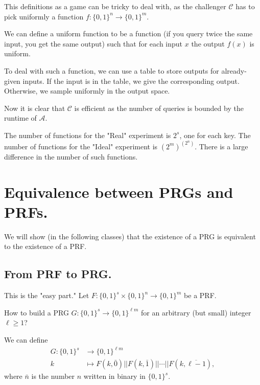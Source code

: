 \documentclass[./main]{subfiles}
\begin{document}
  \begin{rmk}
    This definitions as a game can be tricky to deal with, as the challenger $\mathcal{C}$ has to pick uniformly a function $f : \{0,1\} ^n \to \{0,1\}^m$.

    We can define a uniform function to be a function (if you query twice the same input, you get the same output) such that for each input $x$ the output $f(x)$ is uniform.

    To deal with such a function, we can use a table to store outputs for already-given inputs.
    If the input is in the table, we give the corresponding output. Otherwise, we sample uniformly in the output space.

    Now it is clear that $\mathcal{C}$ is efficient as the number of queries is bounded by the runtime of $\mathcal{A}$.
  \end{rmk}

  The number of functions for the "Real" experiment is $2^s$, one for each key.
  The number of functions for the "Ideal" experiment is $(2^m)^{(2^n)}$.
  There is a large difference in the number of such functions.

  \section{Equivalence between PRGs and PRFs.}

  We will show (in the following classes) that the existence of a PRG is equivalent to the existence of a PRF.

  \subsection{From PRF to PRG.}

  This is the "easy part."
  Let $F : \{0,1\}^s \times \{0,1\}^n \to \{0,1\}^m$ be a PRF.

  How to build a PRG $G : \{0,1\}^s \to \{0,1\}^{\ell m}$ for an arbitrary (but small) integer~$\ell \ge 1$?

  We can define
  \begin{align*}
    G: \{0,1\}^s &\longrightarrow \{0,1\}^{\ell m} \\
    k &\longmapsto F(k, \bar{0}) || F(k, \bar{1}) || \cdots || F(k, \overline{\ell-1}) 
  ,\end{align*}
  where $\bar{n}$ is the number $n$ written in binary in $\{0,1\}^s$.
\end{document}
